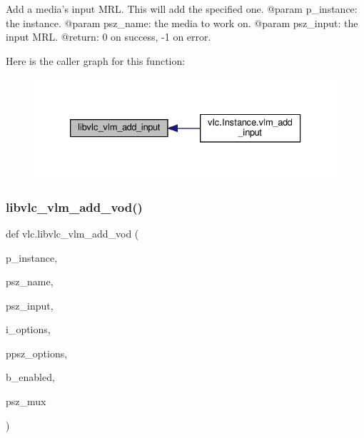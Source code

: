 \begin{DoxyVerb}Add a media's input MRL. This will add the specified one.
@param p_instance: the instance.
@param psz_name: the media to work on.
@param psz_input: the input MRL.
@return: 0 on success, -1 on error.
\end{DoxyVerb}
 Here is the caller graph for this function\+:
\nopagebreak
\begin{figure}[H]
\begin{center}
\leavevmode
\includegraphics[width=333pt]{namespacevlc_a59da7a569de70dd7f4b85f35706b0aa1_icgraph}
\end{center}
\end{figure}
\mbox{\label{namespacevlc_a2ce4add01e56693cb8ca2fdefa8233bb}} 
\subsubsection{\texorpdfstring{libvlc\+\_\+vlm\+\_\+add\+\_\+vod()}{libvlc\_vlm\_add\_vod()}}
{\footnotesize\ttfamily def vlc.\+libvlc\+\_\+vlm\+\_\+add\+\_\+vod (\begin{DoxyParamCaption}\item[{}]{p\+\_\+instance,  }\item[{}]{psz\+\_\+name,  }\item[{}]{psz\+\_\+input,  }\item[{}]{i\+\_\+options,  }\item[{}]{ppsz\+\_\+options,  }\item[{}]{b\+\_\+enabled,  }\item[{}]{psz\+\_\+mux }\end{DoxyParamCaption})}

